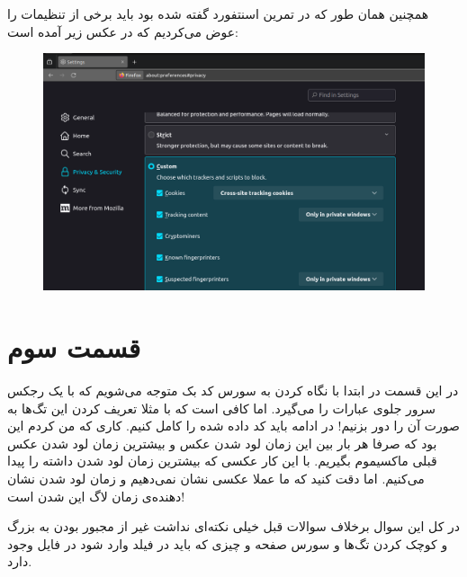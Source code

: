 \documentclass[]{article}
\begin{document}
همچنین همان طور که در تمرین اسنتفورد گفته شده بود باید برخی از تنظیمات
را عوض می‌کردیم که در عکس زیر آمده است:
\begin{figure}[ht]
    \centering
    \includegraphics[scale=0.35]{firefox.png}
\end{figure}
\section*{قسمت سوم}
در این قسمت در ابتدا با نگاه کردن به سورس کد بک متوجه می‌شویم که با یک رجکس سرور جلوی عبارات
را می‌گیرد. اما کافی است که با مثلا تعریف کردن این تگ‌ها به صورت
آن را دور بزنیم! در ادامه باید کد داده شده را کامل کنیم. کاری که من کردم این بود که صرفا
هر بار بین این زمان لود شدن عکس و بیشترین زمان لود شدن عکس قبلی ماکسیموم بگیریم. با این کار عکسی که
بیشترین زمان لود شدن داشته را پیدا می‌کنیم. اما دقت کنید که ما عملا عکسی نشان نمی‌دهیم و زمان لود شدن
نشان دهنده‌ی زمان لاگ این شدن است!

در کل این سوال برخلاف سوالات قبل خیلی نکته‌ای نداشت غیر از مجبور بودن به بزرگ و کوچک کردن تگ‌ها و سورس صفحه و چیزی که باید در فیلد وارد شود در فایل
وجود دارد.
\end{document}
